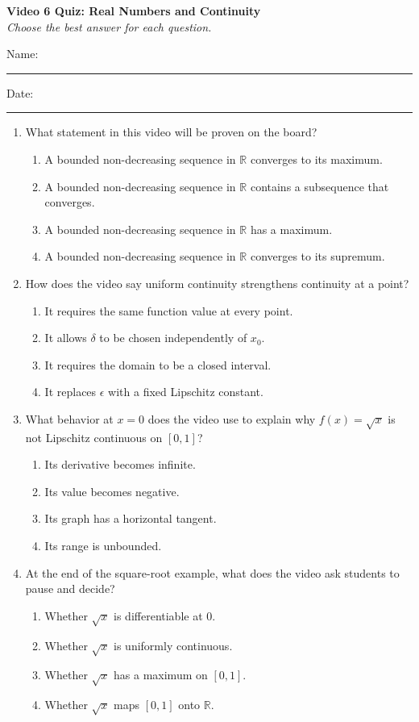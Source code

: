 \documentclass[10pt]{article}
\begin{document}
\begin{center}
  {\large\bfseries Video 6 Quiz: Real Numbers and Continuity}\\[0.25em]
  \textit{Choose the best answer for each question.}
\end{center}
\noindent Name:\ \rule{3.2in}{0.4pt}\hfill Date:\ \rule{1.25in}{0.4pt}
\vspace{0.7em}
\begin{enumerate}
  \item What statement in this video will be proven on the board?
  \begin{enumerate}
    \item A bounded non-decreasing sequence in $\mathbb{R}$ converges to its maximum.
    \item A bounded non-decreasing sequence in $\mathbb{R}$ contains a subsequence that converges.
    \item A bounded non-decreasing sequence in $\mathbb{R}$ has a maximum.
    \item A bounded non-decreasing sequence in $\mathbb{R}$ converges to its supremum.
  \end{enumerate}

  \item How does the video say uniform continuity strengthens continuity at a point?
  \begin{enumerate}
    \item It requires the same function value at every point.
    \item It allows $\delta$ to be chosen independently of $x_0$.
    \item It requires the domain to be a closed interval.
    \item It replaces $\epsilon$ with a fixed Lipschitz constant.
  \end{enumerate}

  \item What behavior at $x=0$ does the video use to explain why $f(x)=\sqrt{x}$ is not Lipschitz continuous on $[0,1]$?
  \begin{enumerate}
    \item Its derivative becomes infinite.
    \item Its value becomes negative.
    \item Its graph has a horizontal tangent.
    \item Its range is unbounded.
  \end{enumerate}

  \item At the end of the square-root example, what does the video ask students to pause and decide?
  \begin{enumerate}
    \item Whether $\sqrt{x}$ is differentiable at $0$.
    \item Whether $\sqrt{x}$ is uniformly continuous.
    \item Whether $\sqrt{x}$ has a maximum on $[0,1]$.
    \item Whether $\sqrt{x}$ maps $[0,1]$ onto $\mathbb{R}$.
  \end{enumerate}
\end{enumerate}
\end{document}

